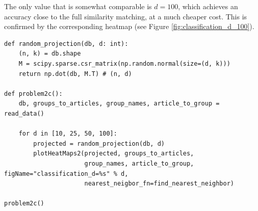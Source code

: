 \documentclass[12pt]{article}
\begin{document}
\begin{enumerate}[label=(\alph*)]
      The only value that is somewhat comparable is $d =100$, which achieves an accuracy close to the full similarity matching, at a much cheaper cost. This is confirmed by the corresponding heatmap (see Figure \ref{fig:classification_d_100}).

\begin{verbatim}
def random_projection(db, d: int):
    (n, k) = db.shape
    M = scipy.sparse.csr_matrix(np.random.normal(size=(d, k)))
    return np.dot(db, M.T) # (n, d)

def problem2c():
    db, groups_to_articles, group_names, article_to_group = read_data()
    
    for d in [10, 25, 50, 100]:
        projected = random_projection(db, d)
        plotHeatMaps2(projected, groups_to_articles,
                      group_names, article_to_group, figName="classification_d=%s" % d,
                      nearest_neigbor_fn=find_nearest_neighbor)

problem2c()
\end{verbatim}
    

\end{enumerate}
\end{document}

